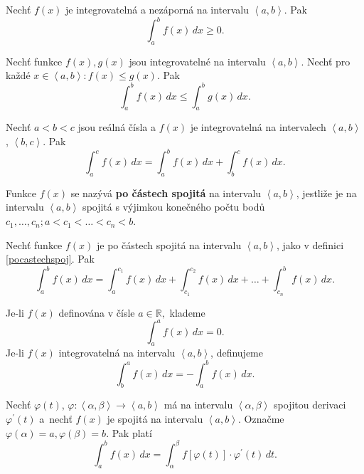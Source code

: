 \begin{veta}
Nechť $f(x)$ je integrovatelná a nezáporná na intervalu $\left < a,b \right > $. Pak
$$\int_a ^b f(x) \, dx \geq 0.$$
\end{veta}

\begin{veta}
Nechť funkce $f(x),g(x)$ jsou integrovatelné na intervalu $\left < a,b \right > .$
Nechť pro každé $x\in \left < a,b \right > :f(x)\leq g(x).$ Pak
$$\int_a^b f(x) \, dx \leq \int_a^b g(x) \, dx.$$
\end{veta}

\begin{veta}
Nechť $a<b<c$ jsou reálná čísla a $f(x)$ je integrovatelná na intervalech
$\left < a,b \right >$, $\left < b,c \right >$. Pak
$$\int_a^c f(x)\, dx = \int_a^b f(x)\, dx + \int_b^c f(x)\, dx.$$
\end{veta}

\begin{definition}\label{pocastechspoj}
Funkce $f(x)$ se nazývá \textbf{po částech spojitá} na intervalu $\left < a,b \right > $,
jestliže je na intervalu $\left < a,b \right > $ spojitá s výjimkou konečného počtu
bodů $c_1,\dots,c_n; a<c_1<\dots<c_n<b.$
\end{definition}

\begin{veta}
Nechť funkce $f(x)$ je po částech spojitá na intervalu $\left < a,b \right > $, jako
v definici \ref{pocastechspoj}. Pak
$$\int_a^b f(x)\, dx = \int_a^{c_1}f(x)\, dx + \int_{c_1}^{c_2}f(x)\, dx + \dots + \int_{c_n}^b f(x)\, dx.$$
\end{veta}

\begin{definition}
Je-li $f(x)$ definována v čísle $a \in \mathbb R,$ klademe
$$\int _a ^a f(x)\, dx = 0.$$
Je-li $f(x)$ integrovatelná na intervalu $\left < a,b \right >$, definujeme
$$\int_b^a f(x)\, dx = -\int_a^b f(x)\, dx.$$
\end{definition}


\begin{veta}\label{ppui}
Nechť $\varphi (t)$, $\varphi: \left < \alpha, \beta \right >\to \left < a,b \right >  $ má na intervalu $\left < \alpha, \beta  \right > $ spojitou derivaci
$\varphi^\prime (t)$ a~nechť $f(x)$ je spojitá na intervalu $\left < a,b \right >$.
Označme
$\varphi(\alpha)=a, \varphi(\beta)=b.$ Pak platí
$$\int _a ^b f(x)\, dx = \int _\alpha ^\beta f \left [ \varphi(t) \right ]\cdot \varphi^\prime (t)\, dt. $$
\end{veta}

